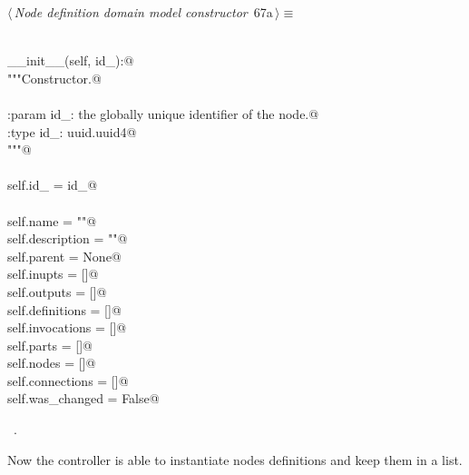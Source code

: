 \documentclass[
    a4paper,      %
    10pt,         %
    openright,    %
    notitlepage,  %
    parskip=half, %
]{scrreprt}       %
\theoremstyle{definition}                    %
\begin{document}
\begin{flushleft} \small
\begin{minipage}{\linewidth}\label{scrap112}\raggedright\small
{} $\langle\,${\itshape Node definition domain model constructor}\nobreak\ {\footnotesize {67a}}$\,\rangle\equiv$
\vspace{-1exm}
\begin{list}{}{} \item
\mbox{}\lstinline@@\\
\mbox{}\lstinline@def __init__(self, id_):@\\
\mbox{}\lstinline@    """Constructor.@\\
\mbox{}\lstinline@@\\
\mbox{}\lstinline@    :param id_: the globally unique identifier of the node.@\\
\mbox{}\lstinline@    :type  id_: uuid.uuid4@\\
\mbox{}\lstinline@    """@\\
\mbox{}\lstinline@@\\
\mbox{}\lstinline@    self.id_         = id_@\\
\mbox{}\lstinline@@\\
\mbox{}\lstinline@    self.name        = ""@\\
\mbox{}\lstinline@    self.description = ""@\\
\mbox{}\lstinline@    self.parent      = None@\\
\mbox{}\lstinline@    self.inupts      = []@\\
\mbox{}\lstinline@    self.outputs     = []@\\
\mbox{}\lstinline@    self.definitions = []@\\
\mbox{}\lstinline@    self.invocations = []@\\
\mbox{}\lstinline@    self.parts       = []@\\
\mbox{}\lstinline@    self.nodes       = []@\\
\mbox{}\lstinline@    self.connections = []@\\
\mbox{}\lstinline@    self.was_changed = False@{\NWsep}
\end{list}
\vspace{-1.5ex}
\footnotesize
\begin{list}{}{\setlength{\itemsep}{-\parsep}\setlength{\itemindent}{-\leftmargin}}
\item \NWtxtMacroRefIn\ .

\item{}
\end{list}
\end{minipage}\vspace{4ex}
\end{flushleft}
Now the controller is able to instantiate nodes definitions and keep them in a
list.
\end{document}
